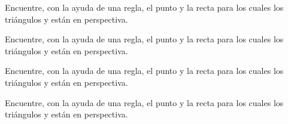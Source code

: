 \newpage
\begin{section-exercise}
    Encuentre, con la ayuda de una regla, el punto y la recta para los cuales los triángulos  y  están en perspectiva.
    \vspace*{\fill}
    \begin{figure}[H]
        \centering
        
    \end{figure}
    \vspace*{\fill}
\end{section-exercise}

\newpage
\begin{section-exercise}
    Encuentre, con la ayuda de una regla, el punto y la recta para los cuales los triángulos  y  están en perspectiva.
    \vspace*{\fill}
    \begin{figure}[H]
        \centering
        
    \end{figure}
    \vspace*{\fill}
\end{section-exercise}

\newpage
\begin{section-exercise}
    Encuentre, con la ayuda de una regla, el punto y la recta para los cuales los triángulos  y  están en perspectiva.
    \vspace*{\fill}
    \begin{figure}[H]
        \centering
        
    \end{figure}
    \vspace*{\fill}
\end{section-exercise}

\newpage
\begin{section-exercise}
    Encuentre, con la ayuda de una regla, el punto y la recta para los cuales los triángulos  y  están en perspectiva.
    \vspace*{\fill}
    \begin{figure}[H]
        \centering
        
    \end{figure}
    \vspace*{\fill}
\end{section-exercise}